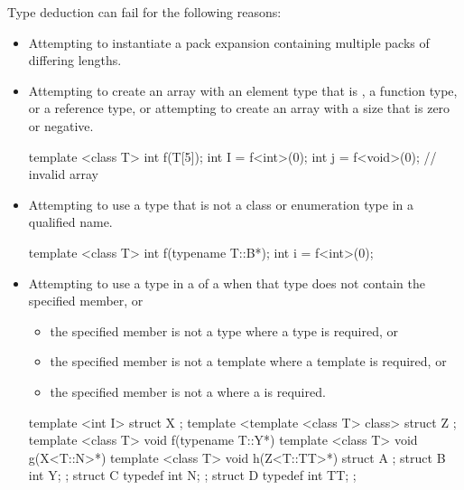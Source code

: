 \documentclass{wg21}
\begin{document}
\begin{note}
Type deduction can fail for the following reasons:
\begin{itemize}
\item Attempting to instantiate a pack expansion containing multiple packs of differing lengths.
\item
Attempting to create an array with an element type that is , a
function type, or a reference type, or attempting
to create an array with a size that is zero or negative.
\begin{example}
\begin{codeblock}
    template <class T> int f(T[5]);
    int I = f<int>(0);
    int j = f<void>(0);             // invalid array
\end{codeblock}
\end{example}
\item
Attempting to use a type that is not a class or enumeration type in a qualified name.
\begin{example}
\begin{codeblock}
    template <class T> int f(typename T::B*);
    int i = f<int>(0);
\end{codeblock}
\end{example}
\item
Attempting to use a type in a  of a
 when
that type does not contain the specified member, or
\begin{itemize}
\item
the specified member is not a type where a type is required, or
\item
the specified member is not a template where a template is required, or
\item
the specified member is not a  where a  is required.
\end{itemize}
\begin{example}
\begin{codeblock}
    template <int I> struct X { };
    template <template <class T> class> struct Z { };
    template <class T> void f(typename T::Y*) {}
    template <class T> void g(X<T::N>*) {}
    template <class T> void h(Z<T::TT>*) {}
    struct A {};
    struct B { int Y; };
    struct C {
        typedef int N;
    };
    struct D {
        typedef int TT;
    };


\end{codeblock}
\end{example}
\end{itemize}
\end{note}
\end{document}
